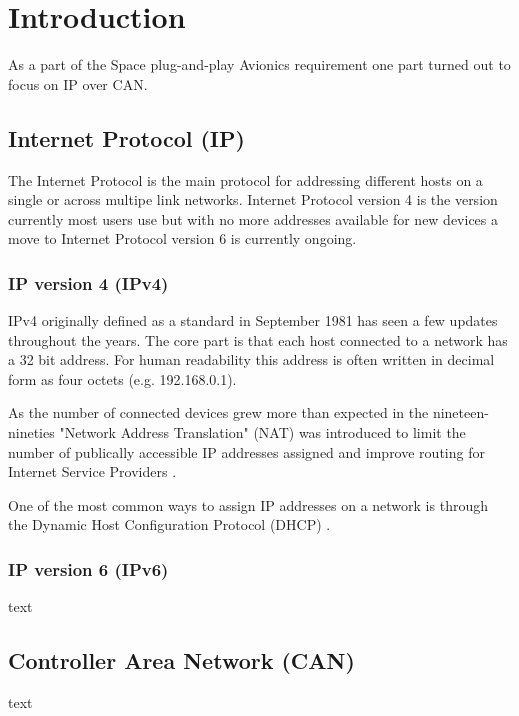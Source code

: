\section{Introduction}\label{sec:introduction}
As a part of the Space plug-and-play Avionics requirement one part turned out
to focus on IP over CAN.

\subsection{Internet Protocol (IP)}
The Internet Protocol is the main protocol for addressing different hosts on a
single or across multipe link networks. Internet Protocol version 4 is the
version currently most users use but with no more addresses available
for new devices a move to Internet Protocol version 6 is currently ongoing.

\subsubsection{IP version 4 (IPv4)}
IPv4 originally defined as a standard in September 1981 \cite{web:rfc791} has
seen a few updates throughout the years. The core part is that each host
connected to a network has a 32 bit address. For human readability this address
is often written in decimal form as four octets (e.g. 192.168.0.1).

As the number of connected devices grew more than expected in the nineteen-nineties
"Network Address Translation" (NAT) was introduced to limit the number of
publically accessible IP addresses assigned and improve routing for Internet
Service Providers \cite{web:rfc1631, web:rfc1918, web:rfc3022}.

One of the most common ways to assign IP addresses on a network is through the
Dynamic Host Configuration Protocol (DHCP) \cite{web:rfc2131, web:rfc2132, web:rfc4361}.

\subsubsection{IP version 6 (IPv6)}
text
\subsection{Controller Area Network (CAN)}
text
